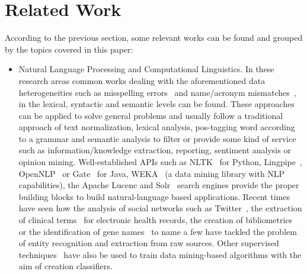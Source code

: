 \documentclass{llncs}
\begin{document}
\section{Related Work}
According to the previous section, some relevant works can be found and grouped by the topics covered in this paper:
\begin{itemize}
 \item Natural Language Processing and Computational Linguistics. In these research areas common works dealing with the aforementioned data heterogeneities 
   such as misspelling errors~\cite{NorvigSpelling,StanfordSpelling} and name/acronym mismatches~\cite{Yeates99automaticextraction,Ratinov:2004:AES:1025132.1026366}, 
  in the lexical, syntactic and semantic levels can be found. These approaches can be applied to solve general problems and usually follow a 
  traditional approach of text normalization, lexical analysis, pos-tagging word according to a grammar and semantic analysis to filter or 
  provide some kind of service such as information/knowledge extraction, reporting, sentiment analysis or opinion mining. 
  Well-established APIs such as NLTK~\cite{LoperBird02} for Python, Lingpipe~\cite{Lingpipe}, OpenNLP~\cite{OpenNLP} or Gate~\cite{Gate} for Java, WEKA~\cite{read12:_scalab} 
  (a data mining library with NLP capabilities), the Apache Lucene and Solr~\cite{rafa2011apache} search engines provide the proper building blocks to build natural-language based applications. 
  Recent times have seen how the analysis of social networks such as Twitter~\cite{Li:2012:TNE:2348283.2348380,Gimpel:2011:PTT:2002736.2002747}, the extraction of 
  clinical terms~\cite{Wang:2009:ARN:1667884.1667888} for electronic health records, the creation of bibliometrics~\cite{Galvez2006,Morillo:2013:TAA:2424697.2424727} or 
  the identification of gene names~\cite{Krauthammer:2004:TIB:1053007.1053018,Galvez2012} to name a few have tackled the problem of entity recognition and extraction from raw sources. 
  Other supervised techniques~\cite{Bohn:2006:PHD} have also be used to train data mining-based algorithms with the aim of creation classifiers.
 

\end{itemize}
\end{document}
